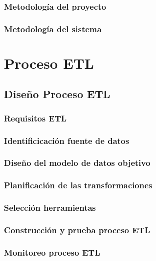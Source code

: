 \documentclass{report}
\begin{document}
\subsection{Metodología del proyecto}


\subsection{Metodología del sistema}


\chapter{Proceso ETL}

\section{Diseño Proceso ETL}


\subsection{Requisitos ETL}


\subsection{Identificicación fuente de datos}


\subsection{Diseño del modelo de datos objetivo}


\subsection{Planificación de las transformaciones}


\subsection{Selección herramientas}


\subsection{Construcción y prueba proceso ETL}


\subsection{Monitoreo proceso ETL}




\end{document}
